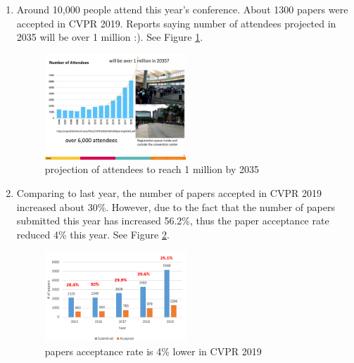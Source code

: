 \documentclass[11pt]{article}
\begin{document}
\begin{enumerate}
    \item Around 10,000 people attend this year's conference. About 1300 papers were accepted in CVPR 2019. Reports saying number of attendees projected in 2035 will be over 1 million :). See Figure \ref{fig:Conf_HL1}.
    \begin{figure}[h!]
        \centering
        \includegraphics[width=0.5\textwidth]{images/Image1.jpeg}
        \caption{projection of attendees to reach 1 million by 2035}
        \label{fig:Conf_HL1}
    \end{figure}
    
    \item Comparing to last year, the number of papers accepted in CVPR 2019 increased about 30\%. However, due to the fact that the number of papers submitted this year has increased 56.2\%, thus the paper acceptance rate reduced 4\% this year. See Figure \ref{fig:Conf_HL2}.
    \begin{figure}[ht!]
        \centering
        \includegraphics[width=0.5\textwidth]{images/Image2.png}
        \caption{papers acceptance rate is 4\% lower in CVPR 2019}
        \label{fig:Conf_HL2}
    \end{figure}
    

\end{enumerate}
\end{document}
